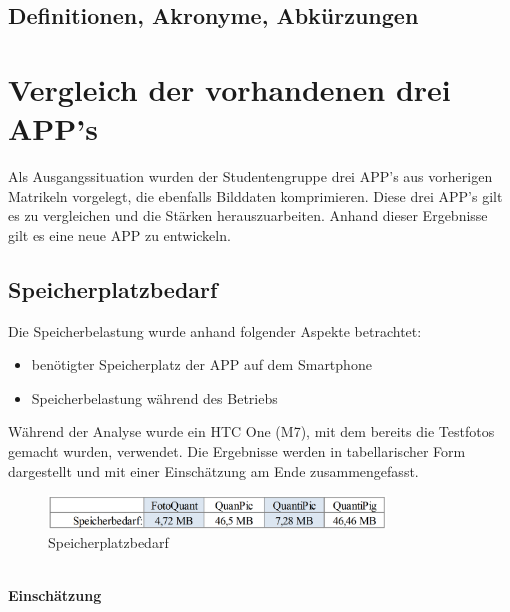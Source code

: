 \subsection{\textbf{Definitionen, Akronyme, Abkürzungen}}
\begin{acronym}[UV-Licht]


\end{acronym}

\section{Vergleich der vorhandenen drei APP's}


Als Ausgangssituation wurden der Studentengruppe drei \acs{APP}'s aus vorherigen Matrikeln vorgelegt, die ebenfalls Bilddaten komprimieren. Diese drei \acs{APP}'s gilt es zu vergleichen und die Stärken herauszuarbeiten. Anhand dieser Ergebnisse gilt es eine neue \acs{APP} zu entwickeln.

\subsection{\textbf{Speicherplatzbedarf}}

Die Speicherbelastung wurde anhand folgender Aspekte betrachtet: 
\begin{itemize}
\item benötigter Speicherplatz der APP auf dem Smartphone
\item Speicherbelastung während des Betriebs
\end{itemize}

Während der Analyse wurde ein HTC One (M7), mit dem bereits die Testfotos gemacht wurden, verwendet. Die Ergebnisse werden in tabellarischer Form dargestellt und mit einer Einschätzung am Ende zusammengefasst.\\
\begin{figure}[h]
	\centering
		\includegraphics[width=0.8\textwidth]{img/speicherplatzbedarf_klein.png}
	\caption[Speicherplatzbedarf]{Speicherplatzbedarf}
	\label{fig:speicher_apps}
\end{figure}
\\\textbf{Einschätzung}\\

